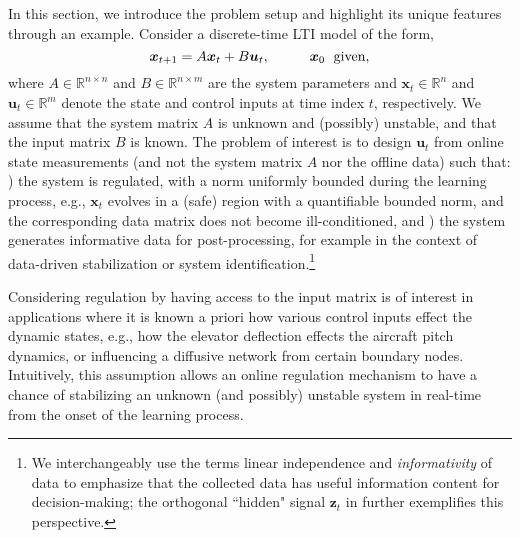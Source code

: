 \documentclass[journal]{IEEEtran}
\theoremstyle{definition}
\theoremstyle{remark}
\newcommand{\RomanNumeralCaps}[1]
    {\MakeUppercase{\romannumeral #1}}
\newcommand\x{{\bm x}}
\def\u{{\bm u}}
\newcommand\z{{\bm z}}
\begin{document}
	In this section, we introduce the problem setup and
	highlight its unique features through an example.
	Consider a discrete-time LTI model of the form,
	\begin{equation}
    	\label{eqn:sys-dynamic}
    	\x_{t+1} = A \x_t + B \u_t, \hspace{10mm} \x_0\ \; \text{given},
	\end{equation}
	where $A\in\mathbb{R}^{n\times n}$ and $B\in\mathbb{R}^{n\times m}$ are the system parameters and $\x_t\in\mathbb{R}^{n}$ and $\u_t\in\mathbb{R}^{m}$ denote the state and control inputs at 
	time index $t$, respectively.
	We assume that the system matrix $A$ is unknown 
	and (possibly) unstable, and that the input matrix $B$ is known.
	The problem of interest is to design $\u_t$ from online state measurements (and not the system matrix $A$ nor the offline data) such that: \RomanNumeralCaps{1}) the system is regulated, with a norm uniformly bounded during the learning process, e.g., $\x_t$ evolves in a (safe) region with a quantifiable bounded norm, and the corresponding data matrix does not become ill-conditioned, and \RomanNumeralCaps{2}) the system generates informative data for post-processing, for example in the context of data-driven stabilization or system identification.\footnote{We interchangeably use the terms linear independence and \textit{informativity} of data to emphasize that the collected data has useful information content for decision-making; the orthogonal ``hidden" signal $\z_t$ in  further exemplifies this perspective.}
	
	{\color{PineGreen}
    Considering regulation by having access to the input matrix is of interest in applications where it is known a priori how various control inputs effect the dynamic states, e.g., how the elevator deflection effects the aircraft pitch dynamics, or  influencing a diffusive network from certain boundary nodes.
    Intuitively, this assumption allows an online regulation mechanism to have a chance of stabilizing an unknown (and possibly) unstable system in real-time from the onset of the learning process.}
        
\end{document}
